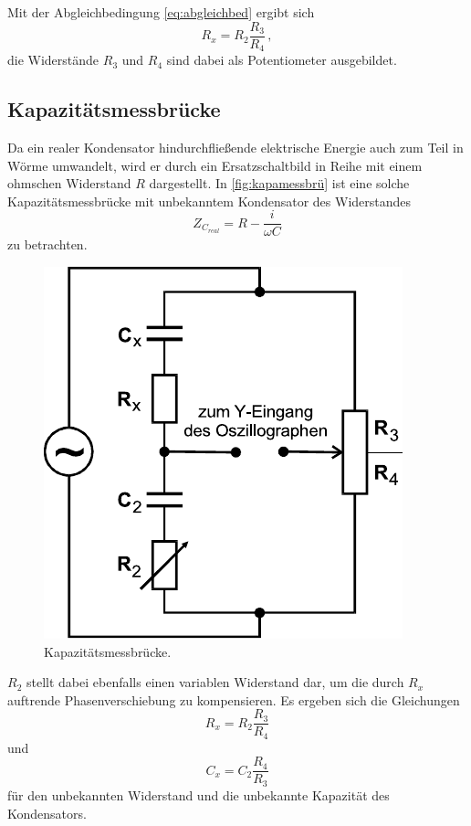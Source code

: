 Mit der Abgleichbedingung \eqref{eq:abgleichbed} ergibt sich
\begin{equation}
    R_x = R_2 \frac{R_3}{R_4} \,,
    \label{eq:resxWheatstone}
\end{equation}
die Widerstände $R_3$ und $R_4$ sind dabei als Potentiometer ausgebildet.


\subsection{Kapazitätsmessbrücke}
\label{subsec:kapamessbrü}

Da ein realer Kondensator hindurchfließende elektrische Energie auch zum Teil in Wörme umwandelt, wird er durch ein Ersatzschaltbild in Reihe mit einem ohmschen Widerstand $R$ dargestellt. 
In \autoref{fig:kapamessbrü} ist eine solche Kapazitätsmessbrücke mit unbekanntem Kondensator des Widerstandes
\begin{equation*}
    Z_{C_{real}} = R - \frac{i}{ω C}
\end{equation*} zu betrachten.

\begin{figure}[H]
    \centering
    \includegraphics{figures/Kapazitätsmessbrücke.pdf}
    \caption{Kapazitätsmessbrücke\cite{ap07}.}
    \label{fig:kapamessbrü}
\end{figure}

$R_2$ stellt dabei ebenfalls einen variablen Widerstand dar, um die durch $R_x$ auftrende Phasenverschiebung zu kompensieren.
Es ergeben sich die Gleichungen
\begin{equation}
    R_x = R_2 \frac{R_3}{R_4}
    \label{eq:resxkapbrü}
\end{equation}
und 
\begin{equation}
    C_x = C_2 \frac{R_4}{R_3}
    \label{eq:kapxkapbrü}
\end{equation}
für den unbekannten Widerstand und die unbekannte Kapazität des Kondensators.


